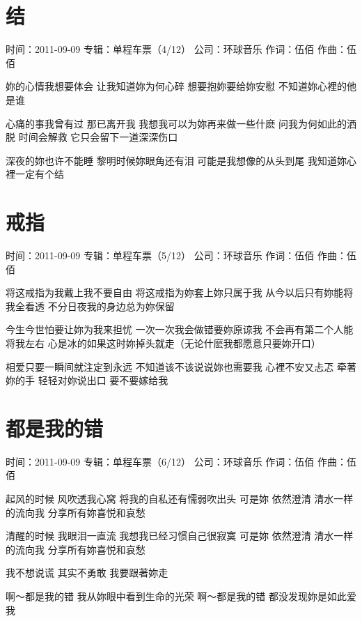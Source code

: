 \documentclass[UTF8,a4paper,oneside,twocolumn,12pt]{ctexbook}
\newcommand{\infopair}[2]{\textbullet #1：#2}
\newcommand{\zc}[1][伍佰]{\infopair{作词}{#1}}
\newcommand{\zq}[1][伍佰]{\infopair{作曲}{#1}}
\newcommand{\zj}[1]{\infopair{专辑}{#1}}
\newcommand{\sj}[1]{\infopair{时间}{#1}}
\newcommand{\gs}[1]{\infopair{公司}{#1}}
\newenvironment{info}{\begin{flushleft}\kaishu
	}
	{\end{flushleft}\normalsize\yahei\par}
\newenvironment{lyric}{
	}
{}
\begin{document}
\section{结}
\begin{info}
	\sj{2011-09-09}
	\zj{单程车票（4/12）}
	\gs{环球音乐}
	\zc
	\zq
\end{info}
\begin{lyric}
	妳的心情我想要体会
	让我知道妳为何心碎
	想要抱妳要给妳安慰
	不知道妳心裡的他是谁

	心痛的事我曾有过 那已离开我
	我想我可以为妳再来做一些什麽
	问我为何如此的洒脱 时间会解救
	它只会留下一道深深伤口

	深夜的妳也许不能睡
	黎明时候妳眼角还有泪
	可能是我想像的从头到尾
	我知道妳心裡一定有个结
\end{lyric}

\section{戒指}
\begin{info}
	\sj{2011-09-09}
	\zj{单程车票（5/12）}
	\gs{环球音乐}
	\zc
	\zq
\end{info}
\begin{lyric}
	将这戒指为我戴上我不要自由
	将这戒指为妳套上妳只属于我
	从今以后只有妳能将我全看透
	不分日夜我的身边总为妳保留

	今生今世怕要让妳为我来担忧
	一次一次我会做错要妳原谅我
	不会再有第二个人能将我左右
	心是冰的如果这时妳掉头就走（无论什麽我都愿意只要妳开口）

	相爱只要一瞬间就注定到永远
	不知道该不该说说妳也需要我
	心裡不安又忐忑 牵著妳的手
	轻轻对妳说出口 要不要嫁给我
\end{lyric}

\section{都是我的错}
\begin{info}
	\sj{2011-09-09}
	\zj{单程车票（6/12）}
	\gs{环球音乐}
	\zc
	\zq
\end{info}
\begin{lyric}
	起风的时候 风吹透我心窝
	将我的自私还有懦弱吹出头
	可是妳 依然澄清
	清水一样的流向我
	分享所有妳喜悦和哀愁

	清醒的时候 我眼泪一直流
	我想我已经习惯自己很寂寞
	可是妳 依然澄清
	清水一样的流向我
	分享所有妳喜悦和哀愁

	我不想说谎
	其实不勇敢
	我要跟著妳走

	啊～都是我的错
	我从妳眼中看到生命的光荣
	啊～都是我的错
	都没发现妳是如此爱我
\end{lyric}
\end{document}
